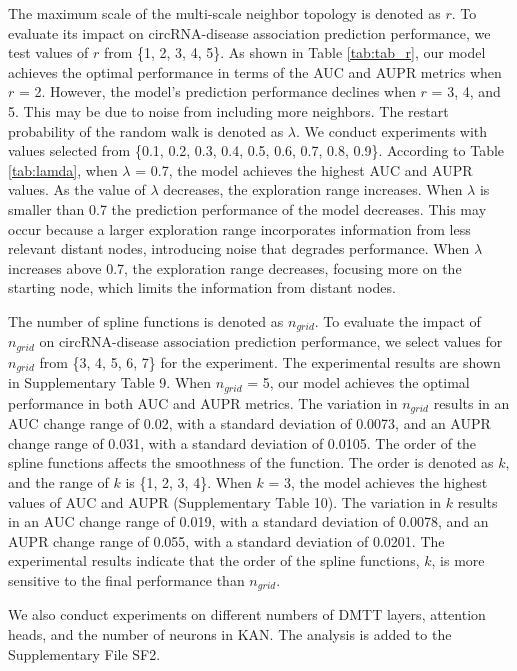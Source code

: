 \documentclass[journal,twoside,web]{ieeecolor}
\begin{document}
The maximum scale of the multi-scale neighbor topology is denoted as $r$. To evaluate its impact on circRNA-disease association prediction performance, we test values of $r$ from \{1, 2, 3, 4, 5\}. As shown in Table \ref{tab:tab_r}, our model achieves the optimal performance in terms of the AUC and AUPR metrics when $r$ = 2. However, the model's prediction performance declines when $r$ = 3, 4, and 5. This may be due to noise from including more neighbors. The restart probability of the random walk is denoted as $\lambda$. We conduct experiments with values selected from \{0.1, 0.2, 0.3, 0.4, 0.5, 0.6, 0.7, 0.8, 0.9\}. According to Table \ref{tab:lamda}, when $\lambda$ = 0.7, the model achieves the highest AUC and AUPR values. As the value of $\lambda$ decreases, the exploration range increases. When $\lambda$ is smaller than 0.7 the prediction performance of the model decreases. This may occur because a larger exploration range incorporates information from less relevant distant nodes, introducing noise that degrades performance. When $\lambda$ increases above 0.7, the exploration range decreases, focusing more on the starting node, which limits the information from distant nodes.%

The number of spline functions is denoted as $n_{grid}$. To evaluate the impact of $n_{grid}$ on circRNA-disease association prediction performance, we select values for $n_{grid}$ from \{3, 4, 5, 6, 7\} for the experiment. The experimental results are shown in Supplementary Table 9. When $n_{grid}$ = 5, our model achieves the optimal performance in both AUC and AUPR metrics. The variation in $n_{grid}$ results in an AUC change range of 0.02, with a standard deviation of 0.0073, and an AUPR change range of 0.031, with a standard deviation of 0.0105. 
The order of the spline functions affects the smoothness of the function. The order is denoted as $k$, and the range of $k$ is \{1, 2, 3, 4\}. When $k$ = 3, the model achieves the highest values of AUC and AUPR (Supplementary Table 10). The variation in $k$ results in an AUC change range of 0.019, with a standard deviation of 0.0078, and an AUPR change range of 0.055, with a standard deviation of 0.0201. The experimental results indicate that the order of the spline functions, $k$, is more sensitive to the final performance than $n_{grid}$.%

We also conduct experiments on different numbers of DMTT layers, attention heads, and the number of neurons in KAN. The analysis is added to the Supplementary File SF2.%
\end{document}
